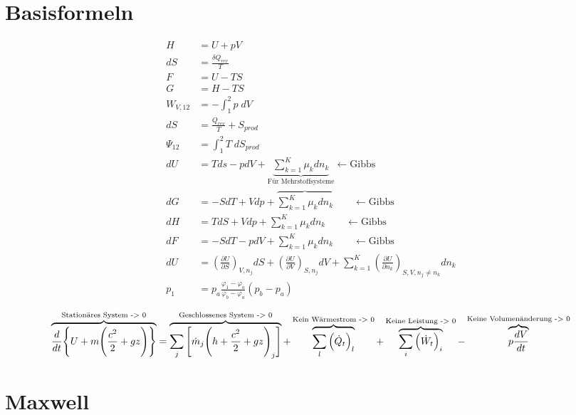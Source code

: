 \documentclass[twocolumn]{article}
\begin{document}
\section{Basisformeln}
\begin{align*}
	H &= U + pV  					\\
	dS&=\frac{\delta Q_{rev}}{T}			\\
	F &= U-TS					\\
	G &= H-TS 					\\
	W_{V,12} &= -\int_{1}^{2} p\; dV 		\\
	dS &= \frac{Q_{rev}}{T} + S_{prod}		\\
	\Psi_{12} &= \int_{1}^{2} T\; dS_{prod}		\\
	dU &= Tds -pdV + \underbrace{\sum_{k=1}^{K} \mu_k dn_k}_{\text{Für Mehrstoffsysteme}} \leftarrow \text{Gibbs} \\
	dG &= -SdT + Vdp +  \overbrace{\sum_{k=1}^{K} \mu_k dn_k} \qquad \leftarrow \text{Gibbs} \\
	dH &= TdS + Vdp + \sum_{k=1}^{K} \mu_k dn_k \qquad \leftarrow \text{Gibbs}\\
	dF &= -SdT -pdV + \sum_{k=1}^{K} \mu _k dn_k \qquad \leftarrow \text{Gibbs}\\
	dU &= \left(\frac{\partial U}{\partial S}\right)_{V,n_j} dS + \left(\frac{\partial U}{\partial V}\right)_{S,n_j} dV + \sum_{k=1}^{K} \left(\frac{\partial U}{\partial n_k}\right)_{S,V,n_j \neq n_k} dn_k  \\
	p_1 &= p_a  \frac{\varphi_1 - \varphi_a}{\varphi_b- \varphi_a}(p_b - p_a) \\
\end{align*}
\begin{equation*}
\overbrace{\frac{d}{dt}\Bigg{\{} U + m \Bigg{(}\frac{c^2}{2}+gz\Bigg{)}\Bigg{\}}}^{\text{Stationäres System -> 0}} = \overbrace{\sum_{j}{\Bigg{[}\dot{m}_j\Bigg{(}h+\frac{c^2}{2}+gz\Bigg{)}_j \Bigg{]}}}^{\text{Geschlossenes System -> 0}}  + \overbrace{\sum_{l}^{} \Big(\dot{Q}_t\Big)_l}^{\text{Kein Wärmestrom -> 0}} + \overbrace{\sum_{i}\Big(\dot{W}_t\Big)_i}^{\text{Keine Leistung -> 0}}- \overbrace{p\frac{dV}{dt}}^{\text{Keine Volumenänderung -> 0}}
\end{equation*}

\section{Maxwell}
\end{document}

